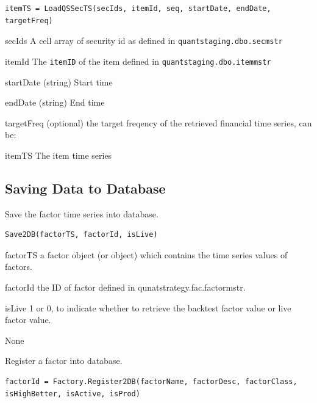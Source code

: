 \usage
   \begin{lstlisting}[numbers=none]
   itemTS = LoadQSSecTS(secIds, itemId, seq, startDate, endDate, targetFreq)
   \end{lstlisting}
\inarg
   \begin{argdesc}
   \item[secIds] A cell array of security id as defined in \texttt{quantstaging.dbo.secmstr}
   \item[itemId] The \texttt{itemID} of the item defined in \texttt{quantstaging.dbo.itemmstr}
   \item[startDate] (string) Start time
   \item[endDate] (string) End time
   \item[targetFreq] (optional) the target freqency of the retrieved financial time series, can be:
                     
   \end{argdesc}
\outarg
   \begin{argdesc}
   \item[itemTS] The item time series
   \end{argdesc}
   
\subsection{Saving Data to Database}

   Save the factor time series into database.

\usage
   \begin{lstlisting}[numbers=none]
   Save2DB(factorTS, factorId, isLive)
   \end{lstlisting}

\inarg
   \begin{argdesc}
	\item[factorTS] a factor object (or \myfints{} object) which contains the time series values of factors. 
	\item[factorId] the ID of factor defined in qunatstrategy.fac.factormstr.
	\item[isLive] 1 or 0, to indicate whether to retrieve the backtest factor value or live factor value.  
   \end{argdesc}

\outarg
    None

    Register a factor into database.

\usage
   \begin{lstlisting}[numbers=none]
   factorId = Factory.Register2DB(factorName, factorDesc, factorClass, isHighBetter, isActive, isProd)
   \end{lstlisting}

